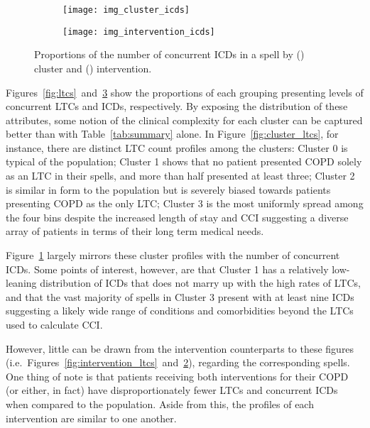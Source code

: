 \documentclass[11pt]{article}
\newlength{\imgwidth}
\begin{document}
\begin{figure}
    \centering
    \begin{subfigure}{.5\imgwidth}
        \texttt{[image: img\_cluster\_icds]}
        \caption{}\label{fig:cluster_icds}
    \end{subfigure}\hfill%
    \begin{subfigure}{.5\imgwidth}
        \texttt{[image: img\_intervention\_icds]}
        \caption{}\label{fig:intervention_icds}
    \end{subfigure}
    \caption{%
        Proportions of the number of concurrent ICDs in a spell by
        () cluster and ()
        intervention.
    }\label{fig:icds}
\end{figure}

Figures~\ref{fig:ltcs}~and~\ref{fig:icds} show the proportions of each grouping
presenting levels of concurrent LTCs and ICDs, respectively. By exposing the
distribution of these attributes, some notion of the clinical complexity for
each cluster can be captured better than with Table~\ref{tab:summary} alone. In
Figure~\ref{fig:cluster_ltcs}, for instance, there are distinct LTC count
profiles among the clusters: Cluster 0 is typical of the population; Cluster 1
shows that no patient presented COPD solely as an LTC in their spells, and more
than half presented at least three; Cluster 2 is similar in form to the
population but is severely biased towards patients presenting COPD as the only
LTC; Cluster 3 is the most uniformly spread among the four bins despite the
increased length of stay and CCI suggesting a diverse array of patients in
terms of their long term medical needs.

Figure~\ref{fig:cluster_icds} largely mirrors these cluster profiles with the
number of concurrent ICDs. Some points of interest, however, are that Cluster 1
has a relatively low-leaning distribution of ICDs that does not marry up with
the high rates of LTCs, and that the vast majority of spells in Cluster 3
present with at least nine ICDs suggesting a likely wide range of conditions and
comorbidities beyond the LTCs used to calculate CCI.\

However, little can be drawn from the intervention counterparts to these figures
(i.e.\ Figures~\ref{fig:intervention_ltcs}~and~\ref{fig:intervention_icds}),
regarding the corresponding spells. One thing of note is that patients receiving
both interventions for their COPD (or either, in fact) have disproportionately
fewer LTCs and concurrent ICDs when compared to the population. Aside from this,
the profiles of each intervention are similar to one another.
\end{document}
